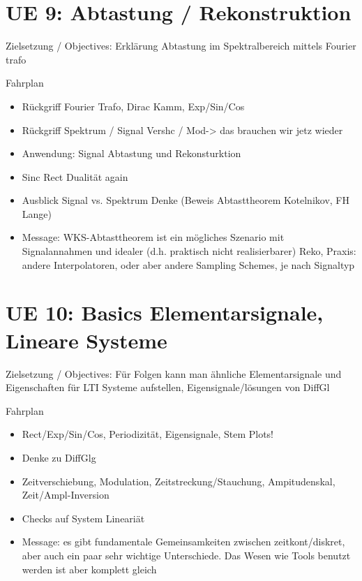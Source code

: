 \newpage
\section{UE 9: Abtastung / Rekonstruktion}
Zielsetzung / Objectives: Erklärung Abtastung im Spektralbereich mittels Fourier trafo

Fahrplan
\begin{itemize}
\item Rückgriff Fourier Trafo, Dirac Kamm, Exp/Sin/Cos
\item Rückgriff Spektrum / Signal Vershc / Mod-> das brauchen wir jetz wieder
\item Anwendung: Signal Abtastung und Rekonsturktion
\item Sinc Rect Dualität again
\item Ausblick Signal vs. Spektrum Denke (Beweis Abtasttheorem Kotelnikov, FH Lange)
\item Message: WKS-Abtasttheorem ist ein mögliches Szenario mit Signalannahmen und
idealer (d.h. praktisch nicht realisierbarer) Reko, Praxis: andere Interpolatoren, oder aber andere Sampling Schemes, je nach Signaltyp
\end{itemize}


\newpage
\section{UE 10: Basics Elementarsignale, Lineare Systeme}
Zielsetzung / Objectives: Für Folgen kann man ähnliche
Elementarsignale und Eigenschaften für LTI Systeme aufstellen, Eigensignale/lösungen von DiffGl

Fahrplan
\begin{itemize}
\item Rect/Exp/Sin/Cos, Periodizität, Eigensignale, Stem Plots!
\item Denke zu DiffGlg
\item Zeitverschiebung, Modulation, Zeitstreckung/Stauchung, Ampitudenskal, Zeit/Ampl-Inversion
\item Checks auf System Lineariät
\item Message: es gibt fundamentale Gemeinsamkeiten zwischen zeitkont/diskret, aber
auch ein paar sehr wichtige Unterschiede. Das Wesen wie Tools benutzt werden ist aber komplett gleich
\end{itemize}

